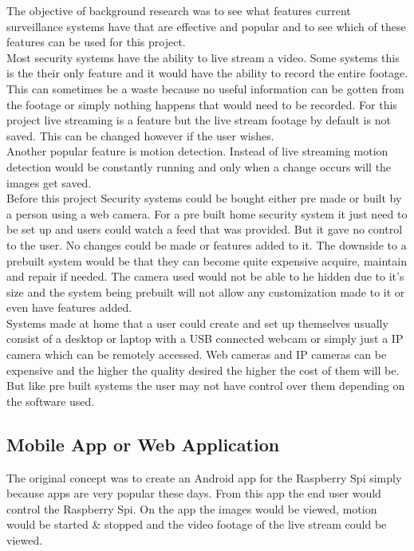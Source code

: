 \documentclass[]{report}
\begin{document}
The objective of background research was to see what features current surveillance systems have that are effective and popular and to see which of these features can be used for this project.\\

Most security systems have the ability to live stream a video. Some systems this is the their only feature and it would have the ability to record the entire footage. This can sometimes be a waste because no useful information can be gotten from the footage or simply nothing happens that would need to be recorded. For this project live streaming is a feature but the live stream footage by default is not saved. This can be changed however if the user wishes.\\
Another popular feature is motion detection. Instead of live streaming motion detection would be constantly running and only when a change occurs will the images get saved. \\

Before this project Security systems could be bought either pre made or built by a person using a web camera. For a pre built home security system it just need to be set up and users could watch a feed that was provided. But it gave no control to the user. No changes could be made or features added to it. The downside to a prebuilt system would be that they can become quite expensive acquire, maintain and repair if needed. The camera used would not be able to he hidden due to it’s size and the system being prebuilt will not allow any customization made to it or even have features added.\\

Systems made at home that a user could create and set up themselves usually consist of a desktop or laptop with a USB connected webcam or simply just a IP camera which can be remotely accessed. Web cameras and IP cameras can be expensive and the higher the quality desired the higher the cost of them will be.  But like pre built systems the user may not have control over them depending on the software used. \\ 

\subsection{Mobile App or Web Application}
\label{subsec:Android}
The original concept was to create an Android app for the Raspberry Spi simply because apps are very popular these days. From this app the end user would control the Raspberry Spi. On the app the images would be viewed, motion would be started \& stopped and the video footage of the live stream could be viewed. \\
\end{document}
